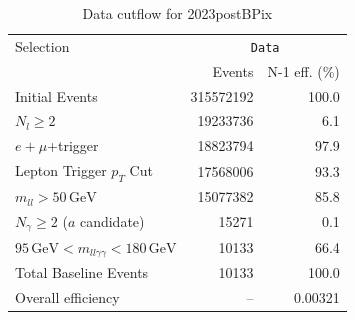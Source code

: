 \begin{table}[htbp]
\centering
\caption{Data cutflow for 2023postBPix}
\label{tab:cutflow-data-2023postbpix}
\footnotesize
\begin{tabular}{lrr}
\hline
Selection & \multicolumn{2}{c}{\texttt{Data}} \\
 & Events & N-1 eff. (\%) \\
\hline
Initial Events & 315572192 & 100.0 \\
$N_{l}\geq 2$ & 19233736 & 6.1 \\
$e+\mu$+trigger & 18823794 & 97.9 \\
Lepton Trigger $p_T$ Cut & 17568006 & 93.3 \\
$m_{ll} > 50\,\mathrm{GeV}$ & 15077382 & 85.8 \\
$N_{\gamma}\geq 2$ ($a$ candidate) & 15271 & 0.1 \\
$95\,\mathrm{GeV} < m_{ll\gamma\gamma} < 180\,\mathrm{GeV}$ & 10133 & 66.4 \\
Total Baseline Events & 10133 & 100.0 \\
\hline
Overall efficiency & -- & 0.00321 \\
\hline
\end{tabular}
\end{table}

